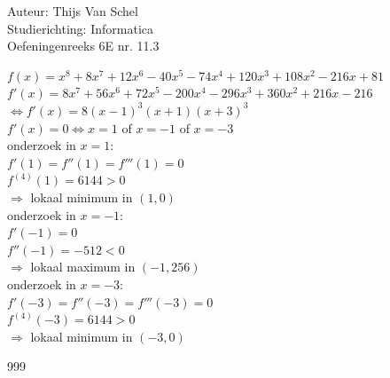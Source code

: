\documentclass[a4paper]{article}
\begin{document}
  
\noindent \large Auteur: Thijs Van Schel\\
\noindent \large Studierichting: Informatica\\
\noindent \large Oefeningenreeks 6E nr. 11.3\\

\medskip

\normalsize

$f(x) = x^8 + 8x^7 + 12x^6 - 40x^5 - 74x^4 + 120x^3 + 108x^2 - 216x + 81$\\

$f'(x) = 8x^7 + 56x^6 + 72x^5 - 200x^4 - 296x^3 + 360x^2 + 216x - 216$\\

$\Leftrightarrow f'(x) = 8(x-1)^3(x+1)(x+3)^3$\\

$f'(x) = 0 \Leftrightarrow x = 1$ of $x = -1$ of $x = -3$\\

onderzoek in $x = 1$:\\

$f'(1) = f''(1) = f'''(1) = 0$\\

$f^{(4)}(1) = 6144 > 0$\\

$\Rightarrow$ lokaal minimum in $(1, 0)$\\

onderzoek in $x = -1$:\\

$f'(-1) = 0$\\

$f''(-1) = -512 < 0$\\

$\Rightarrow$ lokaal maximum in $(-1, 256)$\\

onderzoek in $x = -3$:\\

$f'(-3) = f''(-3) = f'''(-3) = 0$\\

$f^{(4)}(-3) = 6144 > 0$\\

$\Rightarrow$ lokaal minimum in $(-3, 0)$\\

\begin{thebibliography}{999}
\end{thebibliography}
\end{document}

